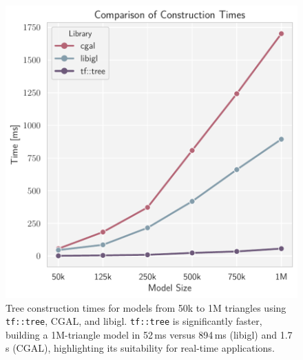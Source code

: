 \begin{figure}[!t]
\includegraphics[width=\linewidth]{../figures/libraries-cons.pdf}
\caption{
Tree construction times for models from 50k to 1M triangles using \texttt{tf::tree}, CGAL, and libigl.
\texttt{tf::tree} is significantly faster, building a 1M-triangle model in 52\,ms versus 894\,ms (libigl) and 1.7\,s (CGAL),
highlighting its suitability for real-time applications.
}
\label{fig:lib-comparison}
\end{figure}
